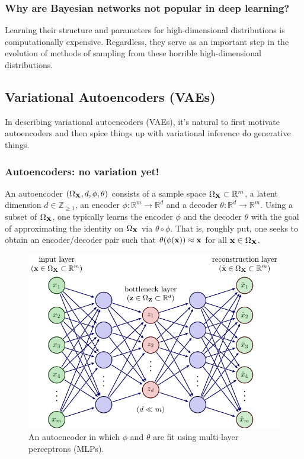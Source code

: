 \documentclass[11pt]{article}
\begin{document}
\subsubsection{Why are Bayesian networks not popular in deep learning?}
Learning their structure and parameters for high-dimensional distributions is computationally expensive. Regardless, they serve as an important step in the evolution of methods of sampling from these horrible high-dimensional distributions.

\subsection{Variational Autoencoders (VAEs)}
In describing variational autoencoders (VAEs), it's natural to first motivate autoencoders and then spice things up with variational inference do generative things.

\subsubsection{Autoencoders: no variation yet!}
\label{sec:autoencoders}
An autoencoder $(\Omega_{\mathbf{X}},d,\phi,\theta)$ consists of a sample space $\Omega_{\mathbf{X}}\subset\mathbb{R}^m$, a latent dimension $d\in\mathbb{Z}_{\geq1}$, an encoder $\phi:\mathbb{R}^m\to\mathbb{R}^d$ and a decoder $\theta:\mathbb{R}^d\to\mathbb{R}^m$. Using a subset of $\Omega_{\mathbf{X}}$, one typically learns the encoder $\phi$ and the decoder $\theta$ with the goal of approximating the identity on $\Omega_{\mathbf{X}}$ via $\theta\circ \phi$. That is, roughly put, one seeks to obtain an encoder/decoder pair such that $\theta(\phi(\mathbf{x}))\approx\mathbf{x}$ for all $\mathbf{x}\in\Omega_{\mathbf{X}}$.

\begin{figure}[t]
    \centering
    \includegraphics[width=\columnwidth]{./figures/generative_models/AE_autoencoder.pdf}
    \caption{An autoencoder in which $\phi$ and $\theta$ are fit using multi-layer perceptrons (MLPs).}
    \label{fig:autoencoder}
\end{figure}
\end{document}
